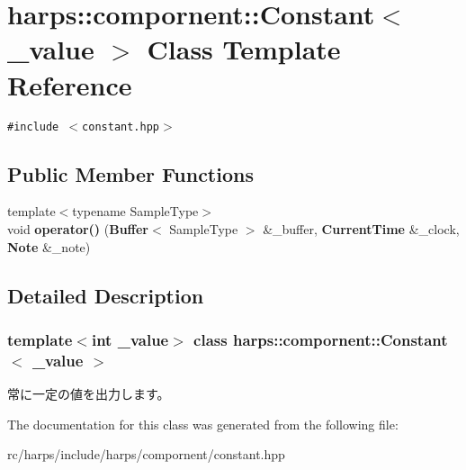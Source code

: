 \section{harps::compornent::Constant$<$ \_\-value $>$ Class Template Reference}
\label{classharps_1_1compornent_1_1Constant}
{\tt \#include $<$constant.hpp$>$}

\subsection*{Public Member Functions}
\begin{CompactItemize}
\item 
{\footnotesize template$<$typename SampleType$>$ }\\void \textbf{operator()} ({\bf Buffer}$<$ SampleType $>$ \&\_\-buffer, {\bf CurrentTime} \&\_\-clock, {\bf Note} \&\_\-note)\label{classharps_1_1compornent_1_1Constant_e4dc4a7527ab078f42ada763db689fd5}

\end{CompactItemize}


\subsection{Detailed Description}
\subsubsection*{template$<$int \_\-value$>$ class harps::compornent::Constant$<$ \_\-value $>$}

常に一定の値を出力します。 

The documentation for this class was generated from the following file:\begin{CompactItemize}
\item 
rc/harps/include/harps/compornent/constant.hpp\end{CompactItemize}
